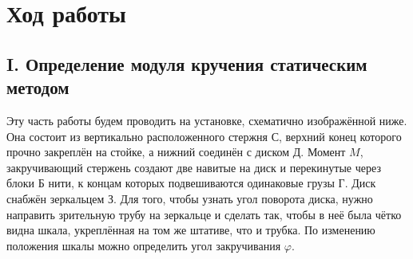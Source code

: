 \documentclass[a4paper, 12pt]{article}
\begin{document}
	\section*{Ход работы}
		\subsection*{I. Определение модуля кручения статическим методом}
				Эту часть работы будем проводить на установке, схематично изображённой ниже. Она состоит из вертикально расположенного стержня С, верхний конец которого прочно закреплён на стойке, а нижний соединён с диском Д. Момент $M$, закручивающий стержень создают две навитые на диск и перекинутые через блоки Б нити, к концам которых подвешиваются одинаковые грузы Г. Диск снабжён зеркальцем З. Для того, чтобы узнать угол поворота диска, нужно направить зрительную трубу на зеркальце и сделать так, чтобы в неё была чётко видна шкала, укреплённая на том же штативе, что и трубка. По изменению положения шкалы можно определить угол закручивания $\varphi$.
				
				\begin{figure}[h]
				\end{figure}
				
\end{document}
